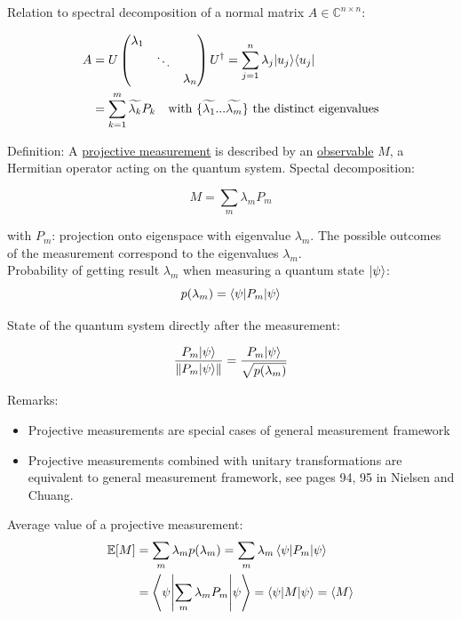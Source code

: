 Relation to spectral decomposition of a normal matrix $A \in \mathbb{C}^{n \times n}$:

\begin{align}
    A &= U \begin{pmatrix*}
        \lambda_1 & & \\
        & \ddots & \\
        & & \lambda_n
    \end{pmatrix*} U^\dag
    = \sum_{j = 1}^n \lambda_j \ket{u_j} \bra{u_j} \\
    &= \sum_{k = 1}^m \widetilde{\lambda_k} P_k \quad 
    \text{with } \{\widetilde{\lambda_1} ... \widetilde{\lambda_m} \} \text{ the distinct eigenvalues}
\end{align}

Definition:
A \underline{projective measurement} is described by an \underline{observable} $M$, 
a Hermitian operator acting on the quantum system.
Spectal decomposition:

\begin{equation}
    M = \sum_m \lambda_m P_m
\end{equation}

with $P_m$: projection onto eigenspace with eigenvalue $\lambda_m$.
The possible outcomes of the measurement correspond to the eigenvalues $\lambda_m$. \\
Probability of getting result $\lambda_m$ when measuring a quantum state $\lvert\psi\rangle$:
\begin{equation}
    p(\lambda_m) = \left \langle \psi \middle| P_m \middle| \psi \right \rangle
\end{equation}

State of the quantum system directly after the measurement:

\begin{equation}
    \frac{P_m \lvert\psi\rangle}{\lVert P_m \lvert\psi\rangle\rVert} = \frac{P_m \lvert\psi\rangle}{\sqrt{p(\lambda_m)}}
\end{equation}

Remarks:
\begin{itemize}
    \item Projective measurements are special cases of general measurement framework
    \item Projective measurements combined with unitary transformations are equivalent to general
    measurement framework, see pages 94, 95 in Nielsen and Chuang.
\end{itemize}

Average value of a projective measurement:
\begin{align}
    \mathbb{E}[M] &= \sum_m \lambda_m p(\lambda_m) = \sum_m \lambda_m \left \langle \psi \middle| P_m \middle| \psi \right \rangle \\
    &= \left \langle \psi \middle| \sum_m \lambda_m P_m \middle| \psi \right \rangle = \left \langle \psi \middle| M \middle| \psi \right \rangle = \langle M \rangle
\end{align}

